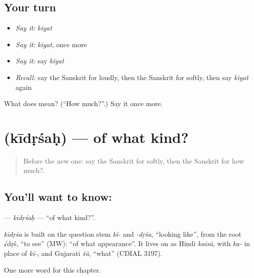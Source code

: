 \subsection*{Your turn}
\begin{itemize}
\raggedright
  \item \emph{Say it:} \emph{kiyat}
  \item \emph{Say it:} \emph{kiyat}, once more
  \item \emph{Say it:} say \emph{kiyat}
  \item \emph{Recall:} say the Sanskrit for loudly, then the Sanskrit for softly, then say \emph{kiyat} again
\end{itemize}

\begin{tcolorbox}[breakable,colback=teal!4,colframe=teal!35!black,title={Before you move on}]
What does  mean? (\textquotedblleft{}How much?\textquotedblright{}.) Say it once more.
\end{tcolorbox}
\section[\texorpdfstring{\sk{कीदृशः} (kīdṛśaḥ)}{कीदृशः (kīdṛśaḥ)}]{ (kīdṛśaḥ) — of what kind?}

\label{lesson:SA-C185-kidrsah}



\begin{quote}
Before the new one: say the Sanskrit for softly, then the Sanskrit for how much?.
\end{quote}

\subsection*{You'll want to know: }
\textbf{} — \emph{kīdṛśaḥ} — \textquotedblleft{}of what kind?\textquotedblright{}.

\begin{cousinweb}
\emph{kīdṛśa} is built on the question stem \emph{kī-} and \emph{-dṛśa}, \textquotedblleft{}looking like\textquotedblright{}, from the root √dṛś, \textquotedblleft{}to see\textquotedblright{} (MW): \textquotedblleft{}of what appearance\textquotedblright{}. It lives on as Hindi \emph{kaisā}, with \emph{ka-} in place of \emph{kī-}, and Gujarati \emph{śũ}, \textquotedblleft{}what\textquotedblright{} (CDIAL 3197).
\end{cousinweb}

\begin{grammarlens}[title={What you've built}]
One more word for this chapter.
\end{grammarlens}

